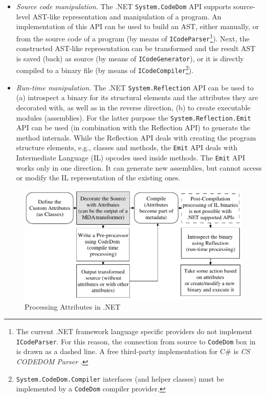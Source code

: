 \begin{itemize}
\item \textit{Source code manipulation.} The .NET \texttt{Sy\-stem.\-CodeDom} API \cite{cdom}  supports source-level AST-like representation and manipulation of a program. An implementation of this API can be used to build an AST, either manually, or from the source code of a program (by means of \texttt{ICode\-Parser}\footnote{The current .NET framework language specific providers do not implement \texttt{ICode\-Parser}. For this reason, the connection from source to \texttt{CodeDom} box in  is drawn as a dashed line. A free third-party implementation for C\# is \textit{CS CODEDOM Parser} \cite{cs.codedom.parser}.}). Next, the constructed AST-like representation can be transformed and the result AST is saved (back) as source (by means of \texttt{ICo\-deGene\-rator}), or it is directly compiled to a binary file (by means of \texttt{ICo\-deCompi\-ler}\footnote{ \texttt{Sy\-stem.Code\-Dom.Compi\-ler} interfaces (and helper classes) must be implemented by a \texttt{Code\-Dom} compiler provider.}).

\item \textit{Run-time manipulation.} The .NET {\tt Sy\-stem.Re\-fle\-ction} API can be used to (a) introspect a binary for its structural elements and the attributes they are decorated with, as well as in the reverse direction, (b) to create executable modules (assemblies). For the latter purpose the {\tt Sy\-stem.\-Refle\-ction.Emit} API can be used (in combination with the Reflection API) to generate the method internals. While the Reflection API deals with creating the program structure elements, e.g., classes and methods, the {\tt Emit} API deals with Intermediate Language (IL) opcodes used inside methods. The {\tt Emit} API works only in one direction. It can generate new assemblies, but cannot access or modify the IL representation of the existing ones.
\end{itemize}

\begin{figure}[ht]
	\begin{center}
		\includegraphics[width=12cm,height=!]{ch03/net-attribute-processing}
	\end{center}
	\caption{Processing Attributes in .NET}
	\label{fig.processing}
\end{figure}

